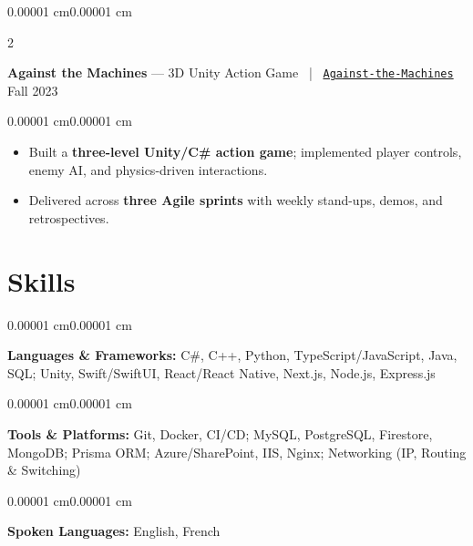 \documentclass[10pt, letterpaper]{article}
\newenvironment{highlights}{
    \begin{itemize}[
        topsep=0.08 cm,
        parsep=0.06 cm,
        partopsep=0pt,
        itemsep=0pt,
        leftmargin=10pt
    ]
}{
    \end{itemize}
}
\newenvironment{onecolentry}{
    \begin{adjustwidth}{0.00001 cm}{0.00001 cm}
}{
    \end{adjustwidth}
}
\newenvironment{twocolentry}[2][3.6cm]{%
    \onecolentry
    \def\secondColumn{#2}%
    \setcolumnwidth{\fill, #1}%
    \begin{paracol}{2}%
}{%
    \switchcolumn \raggedleft \secondColumn
    \end{paracol}
    \endonecolentry
}
\begin{document}
\vspace{0.16 cm}

\begin{twocolentry}{
    Fall 2023
}
    \textbf{Against the Machines} --- 3D Unity Action Game ~|~
    \href{https://github.com/FinlayCooper/Against-the-Machines}{\mbox{\nolinkurl{Against-the-Machines}}}
\end{twocolentry}
\vspace{0.08 cm}
\begin{onecolentry}
    \begin{highlights}
        \item Built a \textbf{three-level Unity/C\# action game}; implemented player controls, enemy AI, and physics-driven interactions.
        \item Delivered across \textbf{three Agile sprints} with weekly stand-ups, demos, and retrospectives.
    \end{highlights}
\end{onecolentry}


    \section{Skills}

    \begin{onecolentry}
        \textbf{Languages \& Frameworks:} C\#, C++, Python, TypeScript/JavaScript, Java, SQL; Unity, Swift/SwiftUI, React/React Native, Next.js, Node.js, Express.js
    \end{onecolentry}
    \vspace{0.08 cm}
    \begin{onecolentry}
        \textbf{Tools \& Platforms:} Git, Docker, CI/CD; MySQL, PostgreSQL, Firestore, MongoDB; Prisma ORM; Azure/SharePoint, IIS, Nginx; Networking (IP, Routing \& Switching)
    \end{onecolentry}
    \vspace{0.08cm}
    \begin{onecolentry}
        \textbf{Spoken Languages:} English, French
    \end{onecolentry}
\end{document}

